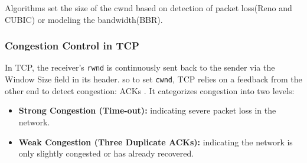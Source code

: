 \documentclass[12pt,a4paper]{article}
\begin{document}
Algorithms set the size of the cwnd based on detection of packet loss(Reno and CUBIC) or modeling the bandwidth(BBR).
\subsubsection{Congestion Control in TCP}
In TCP, the receiver's \texttt{rwnd}  is continuously sent back to the sender via the Window Size field in its  header. so to set \texttt{cwnd}, TCP relies on a  feedback  from the other end to detect congestion: ACKs \cite[p.~778]{forouzan2013}. It categorizes congestion into two levels:
\begin{itemize}
    \item \textbf{Strong Congestion (Time-out):} indicating severe packet loss in the network.
    \item \textbf{Weak Congestion (Three Duplicate ACKs):} indicating the network is only slightly congested or has already recovered.
\end{itemize}
\end{document}
